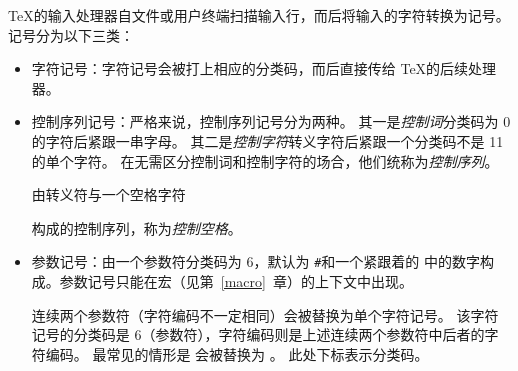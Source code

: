 \documentclass{book}
\begin{document}
\TeX 的输入处理器自文件或用户终端扫描输入行，而后将输入的字符转换为记号。
记号分为以下三类：
\begin{itemize}
\item 字符记号：字符记号会被打上相应的分类码，而后直接传给 \TeX 的后续处理器。
\item 控制序列记号：严格来说，控制序列记号分为两种。
其一是\emph{控制词}\ldash 分类码为 0 的字符后紧跟一串字母。
其二是\emph{控制字符}\ldash 转义字符后紧跟一个分类码不是 11 的单个字符。
在无需区分控制词和控制字符的场合，他们统称为\emph{控制序列}。

由转义符与一个空格字符 \cstoidx {}\par\cs{}\textvisiblespace 构成的控制序列，称为\emph{控制空格}。

\item 参数记号：由一个参数符\ldash 分类码为 6，默认为 \verb-#-\rdash 和一个紧跟着的 中的数字构成。参数记号只能在宏（见第~\ref{macro}~章）的上下文中出现。

连续两个参数符（字符编码不一定相同）会被替换为单个字符记号。
该字符记号的分类码是 6（参数符），字符编码则是上述连续两个参数符中后者的字符编码。
最常见的情形是 \n{\#\#} 会被替换为 。
此处下标表示分类码。
\end{itemize}
\end{document}
